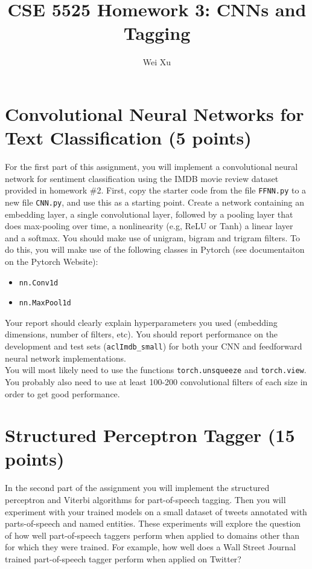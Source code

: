 \documentclass[12pt, letterpaper]{article}
\begin{document}
\title{CSE 5525 Homework 3: CNNs and Tagging}
\author{Wei Xu}
\date{}
\maketitle

\section{Convolutional Neural Networks for Text Classification (5 points)}
For the first part of this assignment, you will implement a convolutional neural network for sentiment classification using the IMDB movie review dataset provided in homework \#2.
First, copy the starter code from the file {\tt FFNN.py} to a new file {\tt CNN.py}, and use this as a starting point.  Create a network containing an embedding layer, a single
convolutional layer, followed by a pooling layer that does max-pooling over time, a nonlinearity (e.g, ReLU or Tanh) a linear layer and a softmax.  You should make use of unigram, bigram and trigram filters.
To do this, you will make use
of the following classes in Pytorch (see documentaiton on the Pytorch Website):
\begin{itemize}
  \item {\tt nn.Conv1d}
  \item {\tt nn.MaxPool1d}
\end{itemize}

Your report should clearly explain hyperparameters you used (embedding dimensions, number of filters, etc).  You should report performance on the development and test sets ({\tt aclImdb\_small}) for both your CNN
and feedforward neural network implementations.\\

 You will most likely need to use the functions {\tt torch.unsqueeze} and {\tt torch.view}.  You probably also need to use at least 100-200 convolutional filters of each size in order to get good performance.

\section{Structured Perceptron Tagger (15 points)}
In the second part of the assignment you will implement the structured perceptron and Viterbi algorithms for part-of-speech
tagging.  Then you will experiment with your trained models on a small dataset of
tweets annotated with parts-of-speech and named entities.  These experiments will explore the question of how well part-of-speech taggers perform when applied to domains other than for which they were trained.  For example,
how well does a Wall Street Journal trained part-of-speech tagger perform when applied on Twitter?
\end{document}
